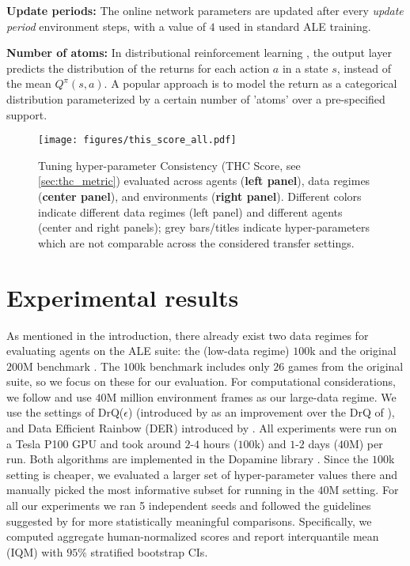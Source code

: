 \documentclass[10pt]{article} %
\begin{document}
{\bf Update periods: }
The online network parameters are updated after every {\em update period} environment steps, with a value of $4$ used in standard ALE training.

{\bf Number of atoms: } 
In distributional reinforcement learning \citep{Bellemare2017ADP}, the output layer predicts the distribution of the returns for each action $a$ in a state $s$, instead of the mean $Q^{\pi}(s, a)$. A popular approach is to model the return as a categorical distribution parameterized by a certain number of 'atoms' over a pre-specified support. 


\begin{figure}[!t]
    \centering
  \texttt{[image: figures/this\_score\_all.pdf]}%
    \caption{Tuning hyper-parameter Consistency (THC Score, see \cref{sec:thc_metric}) evaluated across agents (\textbf{left panel}), data regimes (\textbf{center panel}), and environments  (\textbf{right panel}). Different colors indicate different data regimes (left panel) and different agents (center and right panels); grey bars/titles indicate hyper-parameters which are not comparable across the considered transfer settings.
    \label{fig:this_score_all}%
    }%
\end{figure}



\section{Experimental results} 
\label{exp_results}
As mentioned in the introduction, there already exist two data regimes for evaluating agents on the ALE suite: the (low-data regime) $100$k \citep{kaiser2020modelbased} and the original $200$M benchmark \citep{mnih2015humanlevel}. The $100$k benchmark includes only $26$ games from the original suite, so we focus on these for our evaluation. For computational considerations, we follow \citet{graesser2022state} and use $40$M million environment frames as our large-data regime.
We use the settings of DrQ($\epsilon$) (introduced by \citet{agarwal2021deep} as an improvement over the DrQ of \citet{yarats2021image}), and 
Data Efficient Rainbow (DER) introduced by \citet{hasselt19when}. All experiments were run on a Tesla P100 GPU and took around $2$-$4$ hours ($100$k) and $1$-$2$ days ($40$M) per run.
Both algorithms are implemented in the Dopamine library \citep{castro18dopamine}. Since the $100$k setting is cheaper, we evaluated a larger set of hyper-parameter values there and manually picked the most informative subset for running in the $40$M setting. For all our experiments we ran 5 independent seeds and followed the guidelines suggested by \citet{agarwal2021deep} for more statistically meaningful comparisons. Specifically, we computed aggregate human-normalized scores and report interquantile mean (IQM) with $95\%$ stratified bootstrap CIs. 
\end{document}
